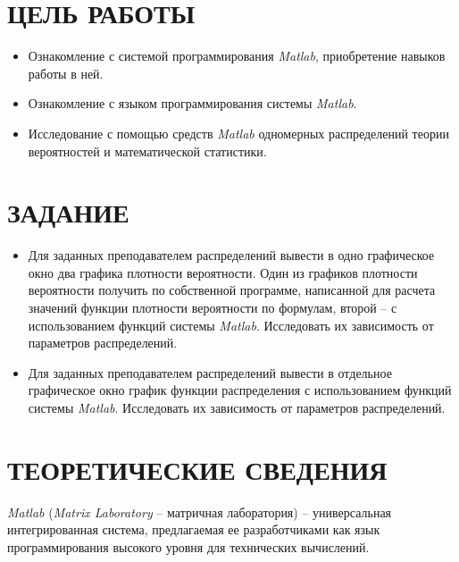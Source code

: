 \documentclass[a4paper,hidelinks,14pt]{extarticle}
\begin{document}

\section{ЦЕЛЬ РАБОТЫ}

\begin{itemize}
	\item Ознакомление  с  системой  программирования \textit{Matlab},  приобретение навыков работы в ней.
	\item Ознакомление с языком программирования системы \textit{Matlab}.
	\item Исследование с помощью средств \textit{Matlab} одномерных распределений теории вероятностей и математической статистики.
\end{itemize}


\section{ЗАДАНИЕ}
\begin{itemize}
\item Для заданных преподавателем распределений  вывести в одно графическое окно два графика плотности вероятности. Один из графиков плотности вероятности получить по собственной программе, написанной для расчета значений функции плотности вероятности по формулам, второй – с использованием функций системы \textit{Matlab}. Исследовать их зависимость от параметров распределений.

\item Для заданных преподавателем распределений  вывести в отдельное графическое окно график функции распределения с использованием функций системы \textit{Matlab}. Исследовать их зависимость от параметров распределений.
\end{itemize}


\newpage


\section{ТЕОРЕТИЧЕСКИЕ СВЕДЕНИЯ}


\textit{Matlab} (\textit{Matrix Laboratory} – матричная лаборатория) – универсальная интегрированная система, предлагаемая ее разработчиками как язык программирования высокого уровня для технических вычислений.
\end{document}

